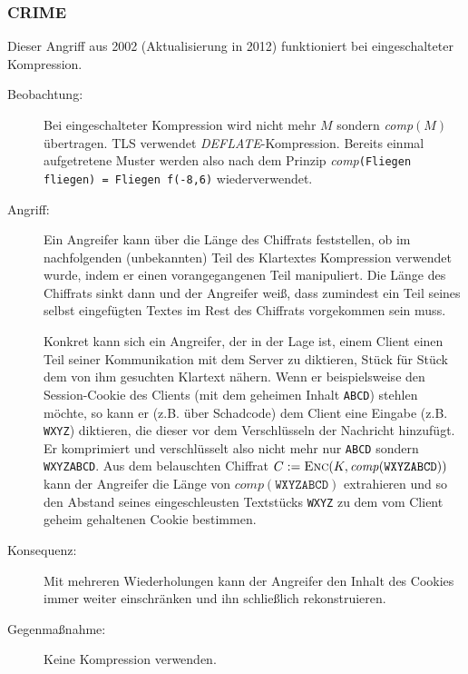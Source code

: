 \subsubsection{CRIME}
\label{sec:keyex:crime}
Dieser Angriff aus 2002 (Aktualisierung in 2012) funktioniert bei eingeschalteter Kompression.
\begin{description}
	\item[Beobachtung:] Bei eingeschalteter Kompression wird nicht mehr $M$ sondern \emph{comp}$(M)$ übertragen. TLS verwendet
	\emph{DEFLATE}-Kompression. Bereits einmal aufgetretene Muster werden also nach dem Prinzip \emph{comp}\texttt{(Fliegen fliegen) = Fliegen
	f(-8,6)} wiederverwendet.
	\item[Angriff:] Ein Angreifer kann über die Länge des Chiffrats feststellen, ob im nachfolgenden (unbekannten) Teil des Klartextes Kompression
	verwendet wurde, indem er einen vorangegangenen Teil manipuliert. Die Länge des Chiffrats sinkt dann und der Angreifer weiß, dass zumindest ein Teil seines
	selbst eingefügten Textes im Rest des Chiffrats vorgekommen sein muss.
	
	Konkret kann sich ein Angreifer, der in der Lage ist, einem Client einen Teil seiner Kommunikation mit dem Server zu diktieren, Stück für
	Stück dem von ihm gesuchten Klartext nähern. Wenn er beispielsweise den Session-Cookie des Clients (mit dem geheimen Inhalt
	\texttt{ABCD}) stehlen möchte, so kann er (z.B. über Schadcode) dem Client eine Eingabe (z.B. \texttt{WXYZ}) diktieren, die dieser vor dem
	Verschlüsseln der Nachricht hinzufügt. Er komprimiert und verschlüsselt also nicht mehr nur \texttt{ABCD} sondern \texttt{WXYZABCD}. Aus
	dem belauschten Chiffrat $C := \textsc{Enc}(K, \mathit{comp}(\mathtt{WXYZABCD}))$ kann der Angreifer die Länge von
	$\mathit{comp}(\mathtt{WXYZABCD})$ extrahieren und so den Abstand seines eingeschleusten Textstücks \texttt{WXYZ} zu dem vom Client geheim
	gehaltenen Cookie bestimmen. 
	\item[Konsequenz:] Mit mehreren Wiederholungen kann der Angreifer den Inhalt des Cookies immer weiter einschränken und ihn schließlich
	rekonstruieren.
	\item[Gegenmaßnahme:] Keine Kompression verwenden.
\end{description}

